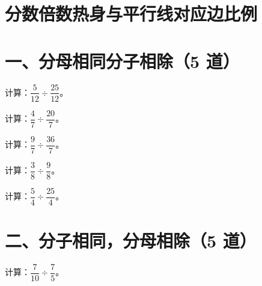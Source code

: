 \documentclass{exam-zh}
\begin{document}
\section*{分数倍数热身与平行线对应边比例}

\section*{一、分母相同分子相除（5 道）}


\begin{problem}[points=5]
    计算：$\dfrac{5}{12}\div\dfrac{25}{12}$。

  \answerarea[22mm]
\end{problem}



\begin{problem}[points=5]
    计算：$\dfrac{4}{7}\div\dfrac{20}{7}$。

  \answerarea[22mm]
\end{problem}



\begin{problem}[points=5]
    计算：$\dfrac{9}{7}\div\dfrac{36}{7}$。

  \answerarea[22mm]
\end{problem}



\begin{problem}[points=5]
    计算：$\dfrac{3}{8}\div\dfrac{9}{8}$。

  \answerarea[22mm]
\end{problem}



\begin{problem}[points=5]
    计算：$\dfrac{5}{4}\div\dfrac{25}{4}$。

  \answerarea[22mm]
\end{problem}


\section*{二、分子相同，分母相除（5 道）}


\begin{problem}[points=5]
    计算：$\dfrac{7}{10}\div\dfrac{7}{5}$。

  \answerarea[22mm]
\end{problem}
\end{document}

